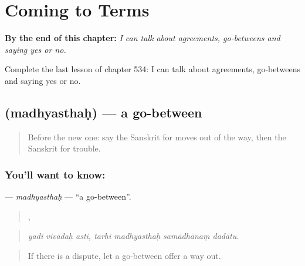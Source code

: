 
\chapter{Coming to Terms}
\label{ch:sa-coming-to-terms}

\begin{chapteropening}
\textbf{By the end of this chapter:} \emph{I can talk about agreements, go-betweens and saying yes or no.}

Complete the last lesson of chapter 534: I can talk about agreements, go-betweens and saying yes or no.
\end{chapteropening}

\section[\texorpdfstring{\sk{मध्यस्थः} (madhyasthaḥ)}{मध्यस्थः (madhyasthaḥ)}]{ (madhyasthaḥ) — a go-between}

\label{lesson:SA-C534-madhyasthah}



\begin{quote}
Before the new one: say the Sanskrit for moves out of the way, then the Sanskrit for trouble.
\end{quote}

\subsection*{You'll want to know: }
\textbf{} — \emph{madhyasthaḥ} — \textquotedblleft{}a go-between\textquotedblright{}.

\begin{quote}
  ,    
\end{quote}

\begin{quote}
\emph{yadi vivādaḥ asti, tarhi madhyasthaḥ samādhānaṃ dadātu.}
\end{quote}

\begin{quote}
If there is a dispute, let a go-between offer a way out.
\end{quote}


